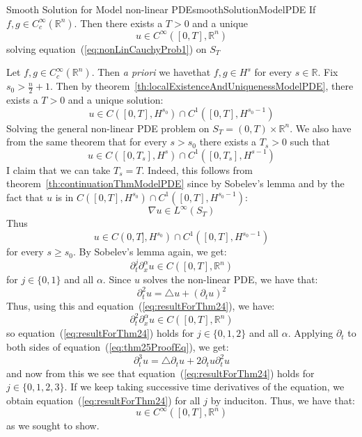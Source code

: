 \documentclass{book}
\newenvironment{Proof}[1][]
  {\begin{ProofTcb}[#1]}
  {\end{ProofTcb}}
\newcommand{\R}{{\mathbb{R}}}
\begin{document}
\begin{thm}{Smooth Solution for Model non-linear PDE}{smoothSolutionModelPDE}
	If $f,g \in C_c^\infty(\R^n)$. Then there exists a $T > 0$ and a unique
	\[
		u \in C^\infty([0,T], \R^n)
	\]
	solving equation~(\ref{eq:nonLinCauchyProb1}) on $S_T$
\end{thm}

\begin{Proof}
	Let $f,g \in C_c^\infty(\R^n)$. Then \emph{a priori} we havethat $f,g \in H^s$ for every $s \in \R$. Fix $s_0
	> \frac{n}{2} + 1$. Then by theorem~\ref{th:localExistenceAndUniquenessModelPDE},
	there exists a $T > 0$ and a unique solution:
	\[
		u \in C([0,T], H^{s_0}) \cap C^1([0,T], H^{s_0 - 1})
	\]
	Solving the general non-linear PDE problem on $S_T = (0, T)\times \R^n$. We also have from the same theorem
	that for every $s > s_0$ there exists a $T_s > 0$ such that
	\[
		u \in C([0, T_s], H^s)\cap C^1([0, T_s], H^{s-1})
	\]
	I claim that we can take $T_s = T$. Indeed, this follows from theorem~\ref{th:continuationThmModelPDE}
	since by Sobelev's lemma and by the fact that $u$ is in $C([0,T], H^{s_0}) \cap C^1([0,T], H^{s_0 - 1})$:
	\[
		\nabla u \in L^\infty(S_T)
	\]
	Thus
	\[
		u \in C(0,T], H^{s_0}) \cap C^1([0,T], H^{s_0 - 1})
	\]
	for every $s \ge s_0$. By Sobelev's lemma again, we get:
	\begin{equation}\label{eq:resultForThm24}
	  \partial_t^j  \partial_x^\alpha u \in C([0, T], \R^n)
	\end{equation}
	for $j \in \{0,1\}$ and all $\alpha$. Since $u$ solves the non-linear PDE, we have that:
	\begin{equation}\label{eq:thm25ProofEq}
	  \partial_t^2 u = \triangle u + (  \partial_t u )^2
	\end{equation}
	 Thus, using this and equation~(\ref{eq:resultForThm24}), we have:
	 \[
		 \partial_t^2  \partial_x^\alpha u \in C([0, T], \R^n)
	 \]
	 so equation~(\ref{eq:resultForThm24}) holds for $j \in \{0,1,2\}$ and all $\alpha$. Applying $  \partial_t$
	 to both sides of equation~(\ref{eq:thm25ProofEq}), we get:
	 \[
		  \partial_t^3 u = \triangle  \partial_t u + 2  \partial_t u  \partial_t^2 u
	  \]
	  and now from this we see that equation~(\ref{eq:resultForThm24}) holds for $j \in \{0,1,2,3\}$. If we keep
	  taking successive time derivatives of the equation, we obtain equation~(\ref{eq:resultForThm24})
	  for all $j$ by induciton. Thus, we have that:
	  \[
		  u \in C^\infty([0, T], \R^n)
	  \]
	  as we sought to show.
\end{Proof}
\end{document}
